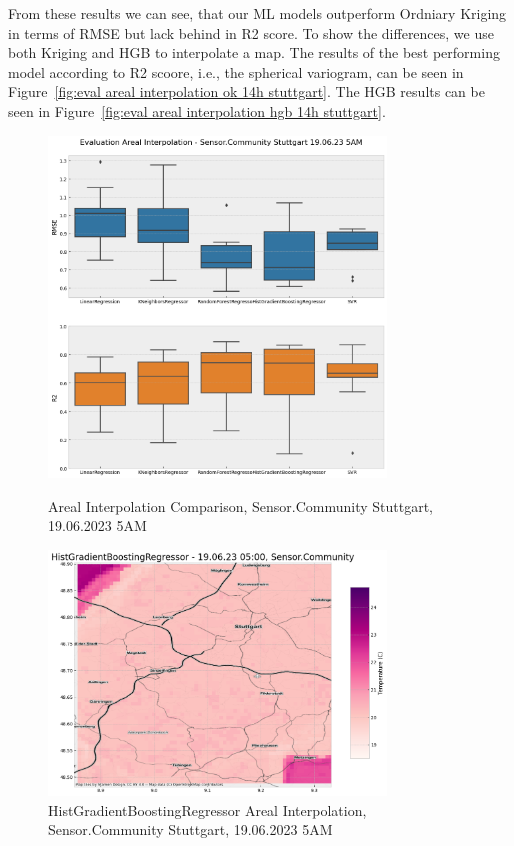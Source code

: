 From these results we can see, that our ML models outperform Ordniary Kriging in terms of RMSE but lack behind in R2 score. To show the differences, we use both Kriging and HGB to interpolate a map. The results of the best performing model according to R2 scoore, i.e., the spherical variogram, can be seen in Figure~\ref{fig:eval areal interpolation ok 14h stuttgart}. The HGB results can be seen in Figure~\ref{fig:eval areal interpolation hgb 14h stuttgart}.\\

\begin{figure}[htp]
    \centering
    \includegraphics[width=0.8\textwidth]{images/eval areal interpolation 19.06.2023 5h.png}
    \caption{Areal Interpolation Comparison, Sensor.Community Stuttgart, 19.06.2023 5AM}
    \label{fig:eval areal interpolation 5h stuttgart}

    \includegraphics[width=0.8\textwidth]{images/eval areal interpolation hgb 5h.png}
    \caption{HistGradientBoostingRegressor Areal Interpolation, Sensor.Community Stuttgart, 19.06.2023 5AM}
    \label{fig:eval areal interpolation 5h stuttgart map}
\end{figure}


